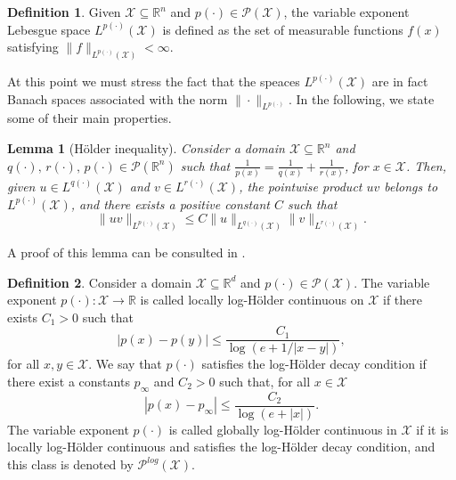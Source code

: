 \documentclass[a4paper,12pt]{amsart}
\theoremstyle{definition}
\newtheorem{definition}{Definition}[section]
\theoremstyle{plain}
\newtheorem{lemma}{Lemma}[section]
\begin{document}
\begin{definition}\label{de2.2}
Given  $\mathcal{X}\subseteq\mathbb{R}^{n}$ and $p(\cdot)\in \mathcal{P}(\mathcal{X})$,  the variable exponent Lebesgue space $L^{p(\cdot)}(\mathcal{X})$ is defined as the set of  measurable functions $f(x)$ satisfying  $\|f\|_{L^{p(\cdot)}(\mathcal{X})}<\infty$.
\end{definition}
At this point we must stress the fact that the speaces $L^{p(\cdot)}(\mathcal{X})$ are in fact Banach spaces associated with the norm $\|\cdot\|_{L^{p(\cdot)}}$.
In the following, we state some of their main properties.%
\begin{lemma}[H\"{o}lder inequality]
Consider a domain $\mathcal{X}\subseteq \mathbb{R}^n$ and $q(\cdot),\,r(\cdot),\,p(\cdot)\in \mathcal{P}(\mathbb{R}^n)$ such that 
$\frac{1}{p(x)}=\frac{1}{q(x)}+\frac{1}{r(x)}$, for $x\in \mathcal{X}$. 
Then, given $u\in L^{q(\cdot)}(\mathcal{X}) $ and $v \in L^{r(\cdot)}(\mathcal{X})$, the pointwise product $uv$ belongs to  $L^{p(\cdot)}(\mathcal{X})$, and there exists  a positive constant $C$ such that 
\begin{equation}\label{eq2.3}
\|uv\|_{L^{p(\cdot)}(\mathcal{X})} \leq C\|u\|_{L^{q(\cdot)}(\mathcal{X})}\|v\|_{L^{r(\cdot)}(\mathcal{X})}.
\end{equation}
\end{lemma}
A proof of this lemma can be consulted in  \cite[Lemma 3.2.20]{Diening_Libro}.
\begin{definition}\label{globallogholder}
Consider  a domain $\mathcal{X}\subseteq \mathbb{R}^d$ 
and  $p(\cdot)\in \mathcal{P}(\mathcal{X})$.
The variable exponent $ p(\cdot): \mathcal{X} \to \mathbb{R} $ is  called locally log-Hölder continuous on $ \mathcal{X} $ if there exists $ C_1 > 0 $ such that
\begin{equation}\label{relation_loc_logholder}
|p(x) - p(y)| \leq \frac{C_1}{\log(e + 1/|x - y|)},
\end{equation}
for all $ x, y \in \mathcal{X} $. We say that $p(\cdot) $ satisfies the  log-Hölder decay condition if there exist a constants $ p_\infty$ and  $ C_2 > 0 $ such that, for all $ x \in \mathcal{X} $  
\begin{equation}\label{relation_decay_logholder}
|p(x) -  p_\infty| \leq \frac{C_2}{\log(e + |x|)}
.
\end{equation}
The variable exponent $ p(\cdot) $ is  called globally log-Hölder continuous in $ \mathcal{X} $ if it is locally log-Hölder continuous and satisfies the log-Hölder decay condition, and this  class  is denoted by 
$\mathcal{P}^{log}(\mathcal{X})$. 
\end{definition}
\end{document}
